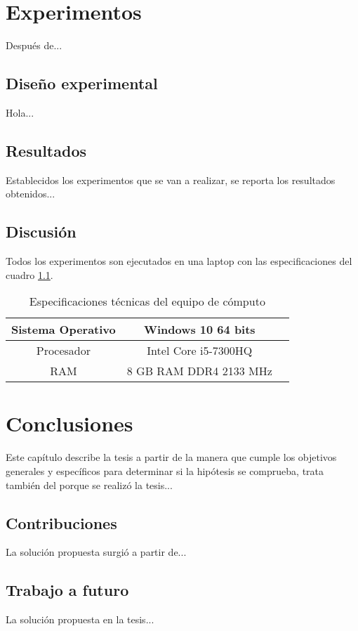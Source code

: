 \chapter{Experimentos}
Después de...

\section{Diseño experimental}
Hola...

\section{Resultados}
Establecidos los experimentos que se van a realizar, se reporta los resultados obtenidos...

\section{Discusión}
Todos los experimentos son ejecutados en una laptop con las especificaciones del cuadro \ref{tab:Especificaciones técnicas del PC}.

\begin{table}[H]
	{\centering
		\caption{Especificaciones técnicas del equipo de cómputo}
		\begin{tabular}{|c|c|c|}
			\hline
			Sistema Operativo & Windows 10 64 bits\\
			\hline
			Procesador & Intel Core i5-7300HQ\\
			\hline
			RAM & 8 GB RAM DDR4 2133 MHz\\
			\hline
		\end{tabular}

	\label{tab:Especificaciones técnicas del PC}
	}
\end{table}


\chapter{Conclusiones}
Este capítulo describe la tesis a partir de la manera que cumple los objetivos generales y específicos para determinar si la hipótesis se comprueba, trata también del porque se realizó la tesis...

\clearpage

\section{Contribuciones}
La solución propuesta surgió a partir de...

\section{Trabajo a futuro}
La solución propuesta en la tesis...